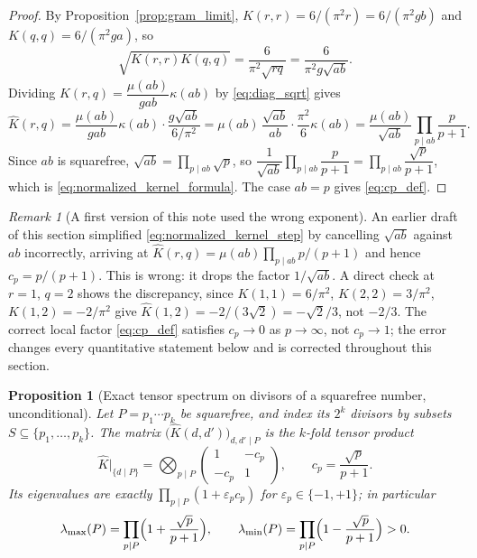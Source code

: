 \documentclass[11pt]{amsart}
\numberwithin{equation}{section}
\theoremstyle{plain}
\newtheorem{proposition}[theorem]{Proposition}
\theoremstyle{definition}
\theoremstyle{remark}
\newtheorem{remark}[theorem]{Remark}
\newcommand{\epsfun}{\varepsilon}
\newcommand{\mob}{\mu}
\begin{document}
\begin{proof}
By Proposition~\ref{prop:gram_limit}, \(K(r,r)=6/(\pi^2 r)=6/(\pi^2 gb)\) and \(K(q,q)=6/(\pi^2 ga)\), so
\begin{equation}
\sqrt{K(r,r)K(q,q)}=\frac6{\pi^2\sqrt{rq}}=\frac6{\pi^2 g\sqrt{ab}}.
\label{eq:diag_sqrt}
\end{equation}
Dividing \(K(r,q)=\dfrac{\mob(ab)}{gab}\kappa(ab)\) by \eqref{eq:diag_sqrt} gives
\begin{equation}
\widehat K(r,q)=\frac{\mob(ab)}{gab}\kappa(ab)\cdot\frac{g\sqrt{ab}}{6/\pi^2}
=\mob(ab)\,\frac{\sqrt{ab}}{ab}\cdot\frac{\pi^2}6\kappa(ab)
=\frac{\mob(ab)}{\sqrt{ab}}\prod_{p\mid ab}\frac p{p+1}.
\label{eq:normalized_kernel_step}
\end{equation}
Since \(ab\) is squarefree, \(\sqrt{ab}=\prod_{p\mid ab}\sqrt p\), so \(\dfrac1{\sqrt{ab}}\prod_{p\mid ab}\dfrac p{p+1}=\prod_{p\mid ab}\dfrac{\sqrt p}{p+1}\), which is \eqref{eq:normalized_kernel_formula}.  The case \(ab=p\) gives \eqref{eq:cp_def}.
\end{proof}

\begin{remark}[A first version of this note used the wrong exponent]
\label{rem:normalization_correction}
An earlier draft of this section simplified \eqref{eq:normalized_kernel_step} by cancelling \(\sqrt{ab}\) against \(ab\) incorrectly, arriving at \(\widehat K(r,q)=\mob(ab)\prod_{p\mid ab}p/(p+1)\) and hence \(c_p=p/(p+1)\).  This is wrong: it drops the factor \(1/\sqrt{ab}\).  A direct check at \(r=1\), \(q=2\) shows the discrepancy, since \(K(1,1)=6/\pi^2\), \(K(2,2)=3/\pi^2\), \(K(1,2)=-2/\pi^2\) give \(\widehat K(1,2)=-2/(3\sqrt2)=-\sqrt2/3\), not \(-2/3\).  The correct local factor \eqref{eq:cp_def} satisfies \(c_p\to0\) as \(p\to\infty\), not \(c_p\to1\); the error changes every quantitative statement below and is corrected throughout this section.
\end{remark}

\begin{proposition}[Exact tensor spectrum on divisors of a squarefree number, unconditional]
\label{prop:tensor_spectrum}
Let \(P=p_1\cdots p_k\) be squarefree, and index its \(2^k\) divisors by subsets \(S\subseteq\{p_1,\ldots,p_k\}\).  The matrix \(\bigl(\widehat K(d,d')\bigr)_{d,d'\mid P}\) is the \(k\)-fold tensor product
\begin{equation}
\widehat K\big|_{\{d\mid P\}}=\bigotimes_{p\mid P}
\begin{pmatrix}1&-c_p\\-c_p&1\end{pmatrix},
\qquad c_p=\frac{\sqrt p}{p+1}.
\label{eq:tensor_spectrum}
\end{equation}
Its eigenvalues are exactly \(\prod_{p\mid P}(1+\epsfun_p c_p)\) for \(\epsfun_p\in\{-1,+1\}\); in particular
\begin{equation}
\lambda_{\max}(P)=\prod_{p\mid P}\Bigl(1+\frac{\sqrt p}{p+1}\Bigr),
\qquad
\lambda_{\min}(P)=\prod_{p\mid P}\Bigl(1-\frac{\sqrt p}{p+1}\Bigr)>0.
\label{eq:lambda_max_def}
\end{equation}
\end{proposition}
\end{document}
